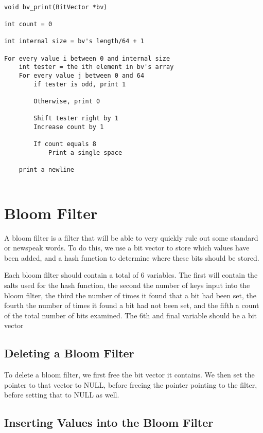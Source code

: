 \documentclass[11pt]{article}
\begin{document}
\begin{verbatim}

void bv_print(BitVector *bv)

int count = 0

int internal size = bv's length/64 + 1

For every value i between 0 and internal size
    int tester = the ith element in bv's array
    For every value j between 0 and 64
        if tester is odd, print 1

        Otherwise, print 0

        Shift tester right by 1
        Increase count by 1

        If count equals 8
            Print a single space

    print a newline


\end{verbatim}

\section{Bloom Filter}

A bloom filter is a filter that will be able to very quickly rule out some standard or newspeak words. To do this, we use a bit vector to store which values have been added, and a hash function to determine where these bits should be stored.

Each bloom filter should contain a total of 6 variables. The first will contain the salts used for the hash function, the second the number of keys input into the bloom filter, the third the number of times it found that a bit had been set, the fourth the number of times it found a bit had not been set, and the fifth a count of the total number of bits examined. The 6th and final variable should be a bit vector

\subsection{Deleting a Bloom Filter}

To delete a bloom filter, we first free the bit vector it contains. We then set the pointer to that vector to NULL, before freeing the pointer pointing to the filter, before setting that to NULL as well.

\subsection{Inserting Values into the Bloom Filter}
\end{document}
